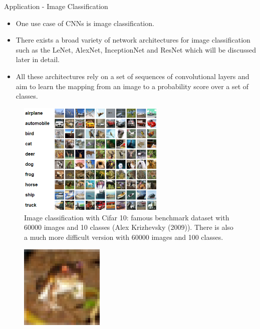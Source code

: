 





\newcommand{\titlefigure}{figure/alexnetfront.png}
\newcommand{\learninggoals}{
  \item Application of CNNs in Visual Recognition
}


\begin{vbframe}{Application - Image Classification}
    \begin{itemize}
        \item One use case of CNNs is image classification.
        \item There exists a broad variety of network architectures for image classification such as the LeNet, AlexNet, InceptionNet and ResNet which will be discussed later in detail.
        \item All these architectures rely on a set of sequences of convolutional layers and aim to learn the mapping from an image to a probability score over a set of classes.
    \end{itemize}
\framebreak
    \begin{figure}
        \centering
        \includegraphics[width=7cm]{figure/recognition.png}
        \caption{Image classification with Cifar 10: famous benchmark dataset with 60000 images and 10 classes (Alex Krizhevsky (2009)). There is also a much more difficult version with 60000 images and 100 classes.}
    \end{figure}
\framebreak
    \begin{figure}
        \centering
        \includegraphics[width=4cm]{figure/cifar_frog.png}

\end{figure}
\end{vbframe}

